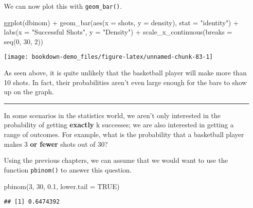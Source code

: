\documentclass[
]{book}
\newenvironment{Shaded}{\begin{snugshade}}{\end{snugshade}}
\newcommand{\AttributeTok}[1]{\textcolor[rgb]{0.77,0.63,0.00}{#1}}
\newcommand{\ConstantTok}[1]{\textcolor[rgb]{0.00,0.00,0.00}{#1}}
\newcommand{\DecValTok}[1]{\textcolor[rgb]{0.00,0.00,0.81}{#1}}
\newcommand{\FloatTok}[1]{\textcolor[rgb]{0.00,0.00,0.81}{#1}}
\newcommand{\FunctionTok}[1]{\textcolor[rgb]{0.00,0.00,0.00}{#1}}
\newcommand{\NormalTok}[1]{#1}
\newcommand{\SpecialCharTok}[1]{\textcolor[rgb]{0.00,0.00,0.00}{#1}}
\newcommand{\StringTok}[1]{\textcolor[rgb]{0.31,0.60,0.02}{#1}}
\begin{document}
We can now plot this with \texttt{geom\_bar()}.

\begin{Shaded}
\begin{Highlighting}[]
\FunctionTok{ggplot}\NormalTok{(dbinom) }\SpecialCharTok{+}
  \FunctionTok{geom\_bar}\NormalTok{(}\FunctionTok{aes}\NormalTok{(}\AttributeTok{x =}\NormalTok{ shots, }\AttributeTok{y =}\NormalTok{ density), }
           \AttributeTok{stat =} \StringTok{"identity"}\NormalTok{) }\SpecialCharTok{+}
  \FunctionTok{labs}\NormalTok{(}\AttributeTok{x =} \StringTok{"Successful Shots"}\NormalTok{, }\AttributeTok{y =} \StringTok{"Density"}\NormalTok{) }\SpecialCharTok{+}
  \FunctionTok{scale\_x\_continuous}\NormalTok{(}\AttributeTok{breaks =} \FunctionTok{seq}\NormalTok{(}\DecValTok{0}\NormalTok{, }\DecValTok{30}\NormalTok{, }\DecValTok{2}\NormalTok{))}
\end{Highlighting}
\end{Shaded}

\begin{center}\texttt{[image: bookdown-demo\_files/figure-latex/unnamed-chunk-83-1]} \end{center}

As seen above, it is quite unlikely that the basketball player will make more than 10 shots. In fact, their probabilities aren't even large enough for the bars to show up on the graph.

\begin{center}\rule{0.5\linewidth}{0.5pt}\end{center}

In some scenarios in the statistics world, we aren't only interested in the probability of getting \textbf{exactly} k successes; we are also interested in getting a range of outcomes. For example, what is the probability that a basketball player makes 3 \textbf{or fewer} shots out of 30?

Using the previous chapters, we can assume that we would want to use the function \texttt{pbinom()} to answer this question.

\begin{Shaded}
\begin{Highlighting}[]
\FunctionTok{pbinom}\NormalTok{(}\DecValTok{3}\NormalTok{, }\DecValTok{30}\NormalTok{, }\FloatTok{0.1}\NormalTok{, }\AttributeTok{lower.tail =} \ConstantTok{TRUE}\NormalTok{)}
\end{Highlighting}
\end{Shaded}

\begin{verbatim}
## [1] 0.6474392
\end{verbatim}
\end{document}
